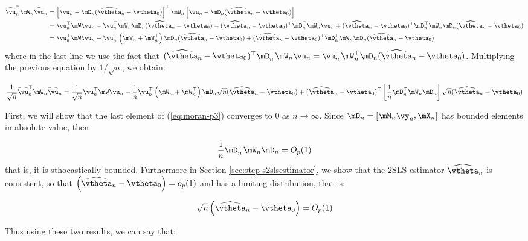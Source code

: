 \documentclass[english,12pt]{book}\usepackage[]{graphicx}\usepackage[]{xcolor}
\begin{document}
\begin{subappendices}
\begin{equation*}
\begin{aligned}
  \widehat{\vu}_n^\top\mW_n\widehat{\vu}_n & = \left[\vu_n - \mD_n(\widehat{\vtheta}_n - \vtheta_0)\right]^\top\mW_n\left[\vu_n - \mD_n(\widehat{\vtheta}_n - \vtheta_0)\right] \\
  & = \vu_n^\top\mW\vu_n - \vu_n^\top\mW_n\mD_n(\widehat{\vtheta}_n - \vtheta_0)-(\widehat{\vtheta}_n - \vtheta_0)^\top\mD_n^\top\mW_n\vu_n +(\widehat{\vtheta}_n - \vtheta_0)^\top\mD_n^\top\mW_n\mD_n(\widehat{\vtheta}_n - \vtheta_0)\\
  & = \vu_n^\top\mW\vu_n - \vu_n^\top\left(\mW_n + \mW_n^\top\right)\mD_n(\widehat{\vtheta}_n - \vtheta_0)+(\widehat{\vtheta}_n - \vtheta_0)^\top\mD_n^\top\mW_n\mD_n(\widehat{\vtheta}_n - \vtheta_0)
\end{aligned}
\end{equation*}
%
where in the last line we use the fact that $(\widehat{\vtheta}_n - \vtheta_0)^\top\mD_n^\top\mW_n\vu_n=\vu_n^\top\mW_n^\top\mD_n(\widehat{\vtheta}_n - \vtheta_0)$. Multiplying the previous equation by $1/\sqrt{n}$, we obtain:

\begin{equation}\label{eq:moran-p3}
\frac{1}{\sqrt{n}}\widehat{\vu}_n^\top\mW_n\widehat{\vu}_n= \frac{1}{\sqrt{n}}\vu_n^\top\mW\vu_n - \frac{1}{n}\vu_n^\top\left(\mW_n + \mW_n^\top\right)\mD_n\sqrt{n}(\widehat{\vtheta}_n - \vtheta_0)+(\widehat{\vtheta}_n - \vtheta_0)^\top\left[\frac{1}{n}\mD_n^\top\mW_n\mD_n\right]\sqrt{n}(\widehat{\vtheta}_n - \vtheta_0)
\end{equation}

First, we will show that the last element of (\ref{eq:moran-p3}) converges to 0 as $n\to \infty$. Since $\mD_n = \left[\mM_n\vy_n, \mX_n\right]$ has bounded elements in absolute value, then 

\begin{equation*}
\frac{1}{n}\mD_n^\top\mW_n\mD_n = O_p(1)
\end{equation*}
%
that is, it is sthocastically bounded. Furthermore in Section \ref{sec:step-s2slsestimator}, we show that the 2SLS estimator $\widehat{\vtheta}_n$ is consistent, so that $\left(\widehat{\vtheta}_n - \vtheta_0\right) = o_p(1)$ and has a limiting distribution, that is:

\begin{equation*}
\sqrt{n}\left(\widehat{\vtheta}_n - \vtheta_0\right) = O_p(1)
\end{equation*}

Thus using these two results, we can say that:


\end{subappendices}
\end{document}
